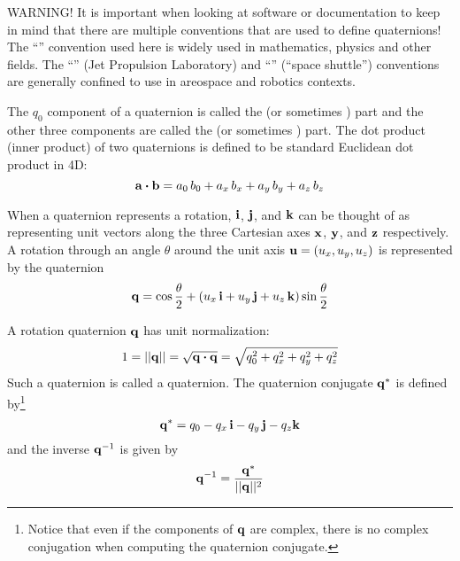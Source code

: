 WARNING! It is important when looking at software or documentation to keep in mind that there are
multiple conventions that are used to define quaternions! The ``'' convention used here
is widely used in mathematics, physics and other fields. The ``'' (Jet Propulsion
Laboratory) and ``'' (``space shuttle'') conventions are generally confined to use in
areospace and robotics contexts\cite{b:yazell,b:sommer}.

The $q_0$ component of a quaternion is called the  (or sometimes ) part and the
other three components are called the  (or sometimes ) part. The dot
product (inner product) of two quaternions is defined to be standard Euclidean dot product in 4D:
\begin{equation}
  {\bf a} \mathbin{\boldsymbol{\cdot}} {\bf b} = a_0 \, b_0 + a_x \, b_x + a_y \, b_y + a_z \, b_z
\end{equation}

When a quaternion represents a rotation, ${\bf i}$, ${\bf j}$, and ${\bf k}$ can be thought of as representing unit
vectors along the three Cartesian axes ${\bf x}$, ${\bf y}$, and ${\bf z}$ respectively. A rotation through an angle
$\theta$ around the unit axis ${\bf u} = (u_x, u_y, u_z)$ is represented by the quaternion
\begin{equation}
  {\bf q} = \cos\frac{\theta}{2} + (u_x \, {\bf i} + u_y \, {\bf j} + u_z \, {\bf k}) \sin\frac{\theta}{2}
  \label{qt2ui}
\end{equation}

A rotation quaternion ${\bf q}$ has unit normalization:
\begin{equation}
  1 = ||{\bf q}|| = \sqrt{{\bf q} \mathbin{\boldsymbol{\cdot}} {\bf q}} = \sqrt{q_0^2 + q_x^2 + q_y^2 + q_z^2}
  \label{1qqq}
\end{equation}
Such a quaternion is called a  quaternion.  The quaternion conjugate ${\bf q}^*$ is defined
by\footnote
  {
Notice that even if the components of ${\bf q}$ are complex, there is no complex conjugation when computing
the quaternion conjugate.
  }
\begin{equation}
  {\bf q}^* = q_0 - q_x \, {\bf i} - q_y \, {\bf j} - q_z {\bf k}
\end{equation}
and the inverse ${\bf q}^{-1}$ is given by
\begin{equation}
  {\bf q}^{-1} = \frac{{\bf q}^*}{||{\bf q}||^2}
\end{equation}


